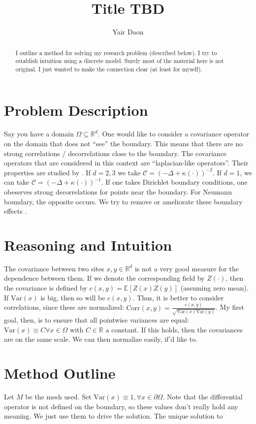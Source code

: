 \documentclass[paper=a4, fontsize=11pt]{scrartcl} %
\title{Title TBD}
\author{Yair Daon}
\date{}
\numberwithin{equation}{section} %
\numberwithin{figure}{section} %
\numberwithin{table}{section} %
\newcommand{\var}{\text{Var}}
\newcommand{\corr}{\text{Corr}}
\begin{document}
\maketitle
\begin{abstract}
  I outline a method for solving my research problem (described below). I try to establish intuition
  using a discrete model. Surely most of the material here is not original. I just wanted to make the
  connection clear (at least for myself).
\end{abstract}

\section{Problem Description}
Say you have a domain $\Omega \subseteq \mathbb{R}^d$. One would like to consider a covariance operator on the domain 
that does not ``see'' the boundary. This means that there are no strong correlations / decorrelations close to
the boundary. The covariance operators that are considered in this context are ``laplacian-like operators''. Their properties
are studied by \cite{stuart2010inverse}.
If $d=2,3$ we take $\mathcal{C} = (-\Delta + \kappa(\cdot) )^{-2}$. If $d=1$, we can take 
$\mathcal{C} = (-\Delta + \kappa(\cdot) )^{-1}$.
If one takes Dirichlet boundary conditions, one obeserves 
strong decorrelations for points near the boundary. For Neumann boundary, the opposite occurs. We try 
to remove or ameliorate these boundary effects \cite{bui2013computational}.

\section{Reasoning and Intuition}
The covariance between two sites $x,y \in \mathbb{R}^d$ is not a very good measure for the dependence 
between them. If we denote the corresponding field by $Z( \cdot )$, then the covariance is 
defined by $c(x,y) =\mathbb{E}[Z(x) Z(y)]$ (assuming zero mean). If $\var(x)$ is big,
then so will be $c(x,y)$. Thus, it is better to consider correlations, since 
these are normalized: $\corr(x,y) = \frac{c(x,y)}{\sqrt{\var(x)\var(y)}}$. My first goal, then, is to ensure
that all pointwise variances are equal: $\var(x) \equiv C \forall x \in \Omega$ with $C \in \mathbb{R}$ a 
constant. If this holds,
then the covariances are on the same scale. We can then normalize easily, if'd like to.

\section{Method Outline}
Let $M$ be the mesh used. 
Set $\var(x) \equiv 1, \forall x \in \partial \Omega$. Note that the differential 
operator is not defined on the boundary, so these values don't really hold any meaning.
We just use them to drive the solution. The unique solution to
\end{document}
